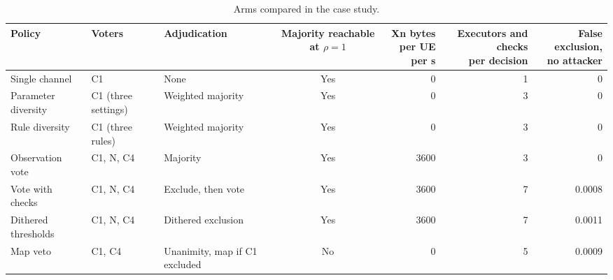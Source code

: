\begin{table}[!t]
  \caption{Arms compared in the case study.}
  \label{tab:arms}
  \centering
  \scriptsize
  \setlength{\tabcolsep}{5pt}
  \begin{tabular}{@{}lllcrrr@{}}
    \hline
    Policy & Voters & Adjudication
      & \shortstack[c]{Majority reachable\\at $\rho = 1$}
      & \shortstack[r]{Xn bytes\\per UE per s}
      & \shortstack[r]{Executors and checks\\per decision}
      & \shortstack[r]{False exclusion,\\no attacker} \\
    \hline
    Single channel & C1 & None & Yes & 0 & 1 & 0 \\
    Parameter diversity & C1 (three settings) & Weighted majority & Yes & 0 & 3 & 0 \\
    Rule diversity & C1 (three rules) & Weighted majority & Yes & 0 & 3 & 0 \\
    Observation vote & C1, N, C4 & Majority & Yes & 3600 & 3 & 0 \\
    Vote with checks & C1, N, C4 & Exclude, then vote & Yes & 3600 & 7 & 0.0008 \\
    Dithered thresholds & C1, N, C4 & Dithered exclusion & Yes & 3600 & 7 & 0.0011 \\
    Map veto & C1, C4 & Unanimity, map if C1 excluded & No & 0 & 5 & 0.0009 \\
    \hline
  \end{tabular}
\end{table}
